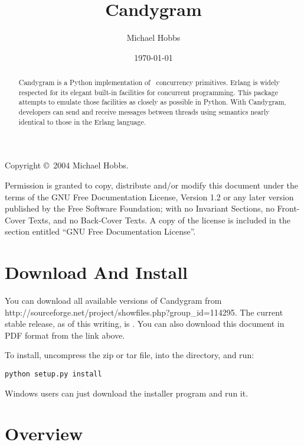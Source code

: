 \documentclass{howto}
\title{Candygram}
\date{\today}
\author{Michael Hobbs}
\newcommand{\Erlang}{\ulink{Erlang}{http://www.erlang.org/}}
\begin{document}
\maketitle

Copyright \copyright\ 2004 Michael Hobbs.

Permission is granted to copy, distribute and/or modify this document
under the terms of the GNU Free Documentation License, Version 1.2
or any later version published by the Free Software Foundation;
with no Invariant Sections, no Front-Cover Texts, and no Back-Cover Texts.
A copy of the license is included in the section entitled ``GNU
Free Documentation License''.

\begin{abstract}
\noindent
Candygram is a Python implementation of \Erlang\ concurrency primitives. Erlang
is widely respected for its elegant built-in facilities for concurrent
programming. This package attempts to emulate those facilities as closely as
possible in Python. With Candygram, developers can send and receive messages
between threads using semantics nearly identical to those in the Erlang
language.
\end{abstract}

\tableofcontents



\section{Download And Install}

You can download all available versions of Candygram from
	{http://sourceforge.net/project/showfiles.php?group_id=114295}. The current
stable release, as of this writing, is \version. You can also download this
document in PDF format from the link above.

To install, uncompress the zip or tar file,  into the directory, and
run:
\begin{verbatim}
python setup.py install
\end{verbatim}

Windows users can just download the installer program and run it.



\section{Overview}
\label{overview}
\end{document}

